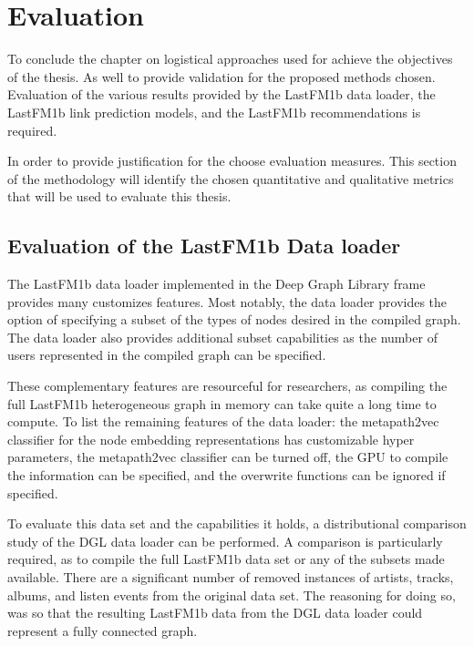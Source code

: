 \section{Evaluation}

To conclude the chapter on logistical approaches used for achieve the objectives of the thesis. As well to provide validation for the proposed methods chosen. Evaluation of the various results provided by the LastFM1b data loader, the LastFM1b link prediction models, and the LastFM1b recommendations is required.

In order to provide justification for the choose evaluation measures. This section of the methodology will identify the chosen quantitative and qualitative metrics that will be used to evaluate this thesis.

\subsection{Evaluation of the LastFM1b Data loader}

The LastFM1b data loader implemented in the Deep Graph Library frame provides many customizes features. Most notably, the data loader provides the option of specifying a subset of the types of nodes desired in the compiled graph. The data loader also provides additional subset capabilities as the number of users represented in the compiled graph can be specified. 

These complementary features are resourceful for researchers, as compiling the full LastFM1b heterogeneous graph in memory can take quite a long time to compute. To list the remaining features of the data loader: the metapath2vec classifier for the node embedding representations has customizable hyper parameters, the metapath2vec classifier can be turned off, the GPU to compile the information can be specified, and the overwrite functions can be ignored if specified.

To evaluate this data set and the capabilities it holds, a distributional comparison study of the DGL data loader can be performed. A comparison is particularly required, as to compile the full LastFM1b data set or any of the subsets made available. There are a significant number of removed instances of artists, tracks, albums, and listen events from the original data set. The reasoning for doing so, was so that the resulting LastFM1b data from the DGL data loader could represent a fully connected graph.


